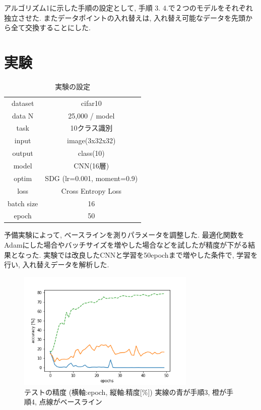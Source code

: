 \documentclass[twocolumn]{jarticle}     %
\begin{document}
	アルゴリズム1に示した手順の設定として, 手順 3. 4.で２つのモデルをそれぞれ独立させた. またデータポイントの入れ替えは, 入れ替え可能なデータを先頭から全て交換することにした.


\section{実験}

	\begin{table}[tb]
		\begin{center}
			\caption{実験の設定}
			\begin{tabular}{|c|c|} \hline
				dataset & cifar10 \\
				data N & 25,000 / model \\ \hline
				task & 10クラス識別 \\
				input & image(3x32x32) \\
				output & class(10) \\ \hline
				model & CNN(16層) \\
				optim & SDG (lr=0.001, moment=0.9) \\
				loss & Cross Entropy Loss \\ \hline
				batch size & 16 \\
				epoch & 50 \\ \hline
			\end{tabular}
			\label{tab:setting}
		\end{center}
	\end{table}

予備実験によって, ベースラインを測りパラメータを調整した. 最適化関数をAdamにした場合やバッチサイズを増やした場合などを試したが精度が下がる結果となった.
実験では改良したCNNと学習を50epochまで増やした条件で, 学習を行い, 入れ替えデータを解析した.

\begin{figure}[tb]
	\begin{center}
		\includegraphics[clip,width=8.5cm]{accuracy.png}
		\caption{テストの精度 (横軸:epoch, 縦軸:精度[\%])
		実線の青が手順3, 橙が手順4,
		点線がベースライン}
		\label{fig:accuracy}
	\end{center}
\end{figure}
\end{document}
